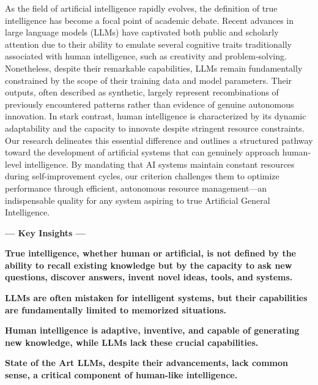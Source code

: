 \documentclass[11pt]{scrartcl}
\begin{document}
As the field of artificial intelligence rapidly evolves, the definition of true intelligence has become a focal point of academic debate. Recent advances in large language models (LLMs) have captivated both public and scholarly attention due to their ability to emulate several cognitive traits traditionally associated with human intelligence, such as creativity and problem-solving. Nonetheless, despite their remarkable capabilities, LLMs remain fundamentally constrained by the scope of their training data and model parameters. Their outputs, often described as synthetic, largely represent recombinations of previously encountered patterns rather than evidence of genuine autonomous innovation. In stark contrast, human intelligence is characterized by its dynamic adaptability and the capacity to innovate despite stringent resource constraints.\\

Our research delineates this essential difference and outlines a structured pathway toward the development of artificial systems that can genuinely approach human-level intelligence. By mandating that AI systems maintain constant resources during self-improvement cycles, our criterion challenges them to optimize performance through efficient, autonomous resource management—an indispensable quality for any system aspiring to true Artificial General Intelligence.\\

\vspace{1cm}

\begin{center}
\begin{huge}
\textbf{— Key Insights —}
\end{huge}
\end{center}

\begin{itemize}
\begin{large}
    \item \textbf{True intelligence, whether human or artificial, is not defined by the ability to recall existing knowledge but by the capacity to ask new questions, discover answers, invent novel ideas, tools, and systems.}
    \item \textbf{LLMs are often mistaken for intelligent systems, but their capabilities are fundamentally limited to memorized situations.}
    \item \textbf{Human intelligence is adaptive, inventive, and capable of generating new knowledge, while LLMs lack these crucial capabilities.}
    	\item \textbf{State of the Art LLMs, despite their advancements, lack common sense, a critical component of human-like intelligence.}
\end{large}
\end{itemize}
\end{document}
